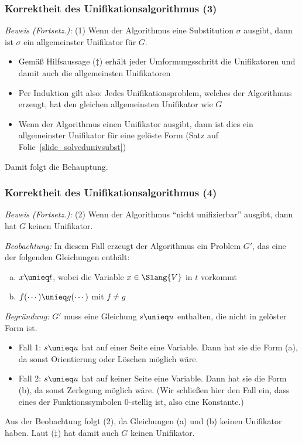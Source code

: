 \documentclass[aspectratio=1610,onlymath]{beamer}
\begin{document}
\begin{frame}[t]\frametitle{Korrektheit des Unifikationsalgorithmus (3)}


\emph{Beweis (Fortsetz.):} (1) Wenn der Algorithmus eine Substitution $\sigma$ ausgibt, dann ist $\sigma$ ein allgemeinster Unifikator für $G$.
\smallskip\pause

\begin{itemize}
\item Gemäß Hilfsaussage ($\ddagger$) erhält jeder Umformungsschritt die Unifikatoren und damit auch die allgemeinsten Unifikatoren\pause
\item Per Induktion gilt also: Jedes Unifikationsproblem, welches der Algorithmus erzeugt, hat den gleichen allgemeinsten Unifikator wie $G$\pause
\item Wenn der Algorithmus einen Unifikator ausgibt, dann ist dies ein allgemeinster Unifikator für eine gelöste Form (Satz auf Folie~\ref{slide_solvedunivsubst})
\end{itemize}
Damit folgt die Behauptung.

\end{frame}

\begin{frame}[t]\frametitle{Korrektheit des Unifikationsalgorithmus (4)}


\emph{Beweis (Fortsetz.):} (2) Wenn der Algorithmus "`nicht unifizierbar"' ausgibt, dann hat $G$ keinen Unifikator.
\smallskip\pause

\emph{Beobachtung:} In diesem Fall erzeugt der Algorithmus ein Problem $G'$, das eine der folgenden Gleichungen enthält:
\begin{enumerate}[(a)]
\item $x\unieq t$, wobei die Variable $x\in\Slang{V}$ in $t$ vorkommt
\item $f(\cdots)\unieq g(\cdots)$ mit $f\neq g$
\end{enumerate}
\pause\emph{Begründung:} $G'$ muss eine Gleichung $s\unieq u$ enthalten, die nicht in gelöster Form ist.
\begin{itemize}
\item Fall 1: $s\unieq u$ hat auf einer Seite eine Variable. Dann hat sie die Form (a), da sonst Orientierung oder Löschen möglich wäre.
\item Fall 2: $s\unieq u$ hat auf keiner Seite eine Variable. Dann hat sie die Form (b), da sonst Zerlegung möglich wäre. (Wir schließen hier den Fall ein, dass eines der Funktionssymbolen 0-stellig ist, also eine Konstante.)
\end{itemize}
\pause Aus der Beobachtung folgt (2), da Gleichungen (a) und (b) keinen Unifikator haben.
Laut ($\ddagger$) hat damit auch $G$ keinen Unifikator.


\end{frame}
\end{document}
